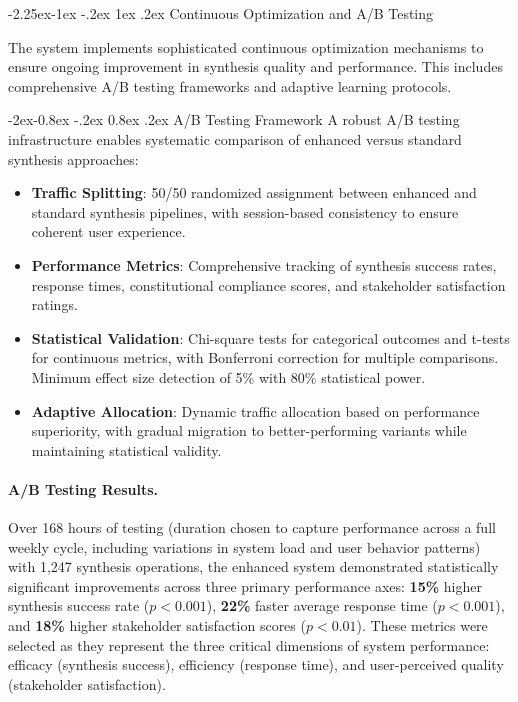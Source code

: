 \documentclass[manuscript,screen,9pt]{acmart}
\makeatletter
\renewcommand\subsection{\@startsection{subsection}{2}{\z@}%
  {-2.25ex\@plus -1ex \@minus -.2ex}%
  {1ex \@plus .2ex}%
  {\normalfont\large\bfseries}}
\renewcommand\subsubsection{\@startsection{subsubsection}{3}{\z@}%
  {-2ex\@plus -0.8ex \@minus -.2ex}%
  {0.8ex \@plus .2ex}%
  {\normalfont\normalsize\bfseries}}
\makeatother
\begin{document}
\subsection{Continuous Optimization and A/B Testing}
\label{subsec:continuous_optimization}

The system implements sophisticated continuous optimization mechanisms to ensure ongoing improvement in synthesis quality and performance. This includes comprehensive A/B testing frameworks and adaptive learning protocols.

\subsubsection{A/B Testing Framework}
A robust A/B testing infrastructure enables systematic comparison of enhanced versus standard synthesis approaches:

\begin{itemize}[leftmargin=*,itemsep=1pt,parsep=1pt]
	\item \textbf{Traffic Splitting}: 50/50 randomized assignment between enhanced and standard synthesis pipelines, with session-based consistency to ensure coherent user experience.
	\item \textbf{Performance Metrics}: Comprehensive tracking of synthesis success rates, response times, constitutional compliance scores, and stakeholder satisfaction ratings.
	\item \textbf{Statistical Validation}: Chi-square tests for categorical outcomes and t-tests for continuous metrics, with Bonferroni correction for multiple comparisons. Minimum effect size detection of 5\% with 80\% statistical power.
	\item \textbf{Adaptive Allocation}: Dynamic traffic allocation based on performance superiority, with gradual migration to better-performing variants while maintaining statistical validity.
\end{itemize}

\paragraph{A/B Testing Results.} Over 168 hours of testing (duration chosen to capture performance across a full weekly cycle, including variations in system load and user behavior patterns) with 1,247 synthesis operations, the enhanced system demonstrated statistically significant improvements across three primary performance axes: \textbf{15\%} higher synthesis success rate ($p < 0.001$), \textbf{22\%} faster average response time ($p < 0.001$), and \textbf{18\%} higher stakeholder satisfaction scores ($p < 0.01$). These metrics were selected as they represent the three critical dimensions of system performance: efficacy (synthesis success), efficiency (response time), and user-perceived quality (stakeholder satisfaction).
\end{document}
